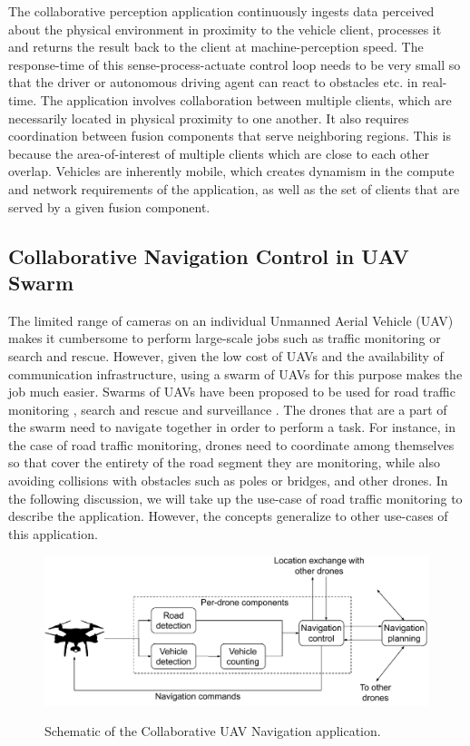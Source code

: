 \par The collaborative perception application continuously ingests data perceived about the physical environment in proximity to the vehicle client, processes it and returns the result back to the client at machine-perception speed. The response-time of this sense-process-actuate control loop needs to be very small so that the driver or autonomous driving agent can react to obstacles etc. in real-time. The application involves collaboration between multiple clients, which are necessarily located in physical proximity to one another. It also requires coordination between fusion components that serve neighboring regions. This is because the area-of-interest of multiple clients which are close to each other overlap. Vehicles are inherently mobile, which creates dynamism in the compute and network requirements of the application, as well as the set of clients that are served by a given fusion component. 

\subsection{Collaborative Navigation Control in UAV Swarm}
The limited range of cameras on an individual Unmanned Aerial Vehicle (UAV) makes it cumbersome to perform large-scale jobs such as traffic monitoring or search and rescue. However, given the low cost of UAVs and the availability of communication infrastructure, using a swarm of UAVs for this purpose makes the job much easier. Swarms of UAVs have been proposed to be used for road traffic monitoring \cite{huang2021decentralized}, search and rescue \cite{scherer2015autonomous} and surveillance \cite{meng2015skystitch}. The drones that are a part of the swarm need to navigate together in order to perform a task. For instance, in the case of road traffic monitoring, drones need to coordinate among themselves so that cover the entirety of the road segment they are monitoring, while also avoiding collisions with obstacles such as poles or bridges, and other drones. In the following discussion, we will take up the use-case of road traffic monitoring to describe the application. However, the concepts generalize to other use-cases of this application.

\begin{figure}[h]
\centering
\includegraphics[width=0.75\columnwidth]{figures/apps/collab_drone_navigation}
\label{fig:collab_drone_navig}
\caption{Schematic of the Collaborative UAV Navigation application.}
\end{figure}

